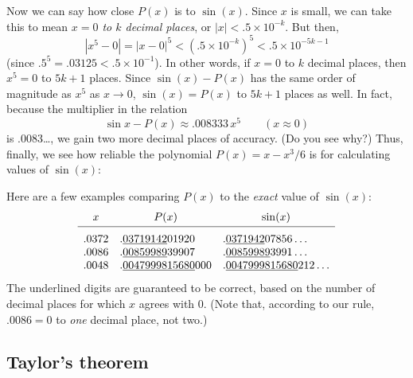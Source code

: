{{{{        Now we can say how close $P(x)$ is to $\sin(x)$.  
Since $x$ is small, we can take this to mean {\em $x = 0$ to $k$ decimal places}, or $|x| < .5 \times 10^{-k}$.  But then,
        \[
|x^5 - 0| = |x - 0|^5 < (.5 \times 10^{-k})^5 < .5 \times 10^{-5k - 1}
\]
(since $.5^5 = .03125  < .5 \times 10^{-1}$).  In other words, if $x = 0$ to $k$ decimal places, then $x^5 = 0$ to $5k + 1$ places.  Since $\sin(x) - P(x)$ has the same order of magnitude as $x^5$ as $x \to 0$, $\sin(x) = P(x)$ to $5k + 1$ places as well.  In fact, because the multiplier in the relation
        \[
\sin{x} - P(x) \approx .008333 \, x^5 \qquad 
                (x \approx 0)
\]
is .0083\ldots , we gain two more decimal places of accuracy.  (Do you see why?)  Thus, finally, we see how reliable the polynomial $P(x) = x - x^3/6$ is for calculating values of $\sin(x)$:   
\begin{center}
\end{center}
Here are a few examples comparing $P(x)$ to the {\em exact\/} value of $\sin(x)$:
{\small
\addtolength{\arraycolsep}{8pt}
        \[
\begin{array}{lll}
        \multicolumn{1}{c}{x} & \multicolumn{1}{c}{P(x)} &
                \multicolumn{1}{c}{\sin(x)} \\[2pt]
        \hline
        .0372   &  .\underline{03719142}01920 & 
             .\underline{0371942}07856\ldots \rule{0pt}{14pt} \\
        .0086   & .\underline{00859989}39907 &
             .\underline{00859989}3991\ldots \\
        .0048   & .\underline{0047999815680}000 &
                 .\underline{0047999815680}212\ldots
        \end{array}
\]
}
The underlined digits are guaranteed to be correct, based on the number of decimal places for which $x$ agrees with 0.  (Note that, according to our rule, $.0086 = 0$ to {\em one\/} decimal place, not two.)\label{endsine}

\subsection{Taylor's theorem}

}}}}
